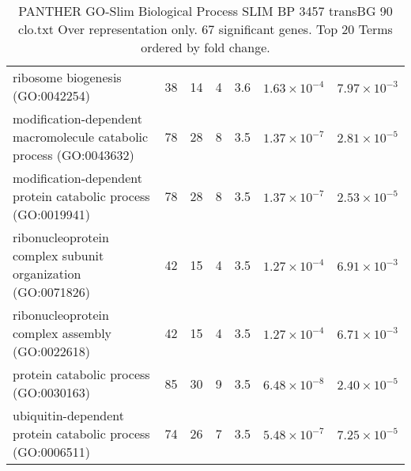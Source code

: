 \begin{table}[ht]
\begin{adjustbox}{width=\textwidth}
\begin{tabular}{lrrrrrr}
  ribosome biogenesis (GO:0042254) & 38 & 14 & 4 & 3.6 & $1.63 \times 10^{-4}$ & $7.97 \times 10^{-3}$ \\ 
  modification-dependent macromolecule catabolic process (GO:0043632) & 78 & 28 & 8 & 3.5 & $1.37 \times 10^{-7}$ & $2.81 \times 10^{-5}$ \\ 
  modification-dependent protein catabolic process (GO:0019941) & 78 & 28 & 8 & 3.5 & $1.37 \times 10^{-7}$ & $2.53 \times 10^{-5}$ \\ 
  ribonucleoprotein complex subunit organization (GO:0071826) & 42 & 15 & 4 & 3.5 & $1.27 \times 10^{-4}$ & $6.91 \times 10^{-3}$ \\ 
  ribonucleoprotein complex assembly (GO:0022618) & 42 & 15 & 4 & 3.5 & $1.27 \times 10^{-4}$ & $6.71 \times 10^{-3}$ \\ 
  protein catabolic process (GO:0030163) & 85 & 30 & 9 & 3.5 & $6.48 \times 10^{-8}$ & $2.40 \times 10^{-5}$ \\ 
  ubiquitin-dependent protein catabolic process (GO:0006511) & 74 & 26 & 7 & 3.5 & $5.48 \times 10^{-7}$ & $7.25 \times 10^{-5}$ \\ 
   \hline
\end{tabular}
\end{adjustbox}
\caption{PANTHER GO-Slim Biological Process SLIM BP 3457 transBG 90 clo.txt Over representation only. 67 significant genes. Top 20 Terms ordered by fold change. } 
\label{tab:PANTHER GO-Slim Biological Process SLIM BP 3457 transBG 90 clo.txt Over representation only. 67 significant genes. Top 20 Terms ordered by fold change. }
\end{table}



